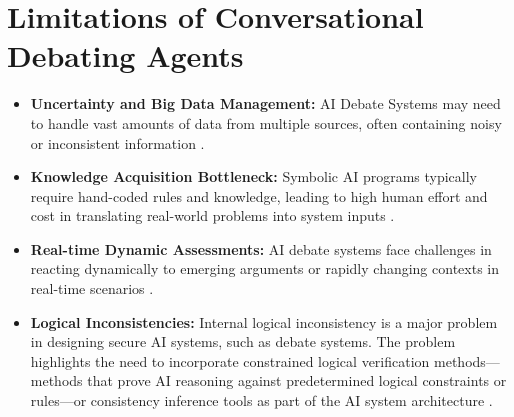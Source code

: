 \documentclass[conference]{IEEEtran}
\begin{document}
\section{Limitations of Conversational Debating Agents}
\begin{itemize}
    \item \textbf{Uncertainty and Big Data Management:} AI Debate Systems may need to handle vast amounts of data from multiple sources, often containing noisy or inconsistent information \cite{b11}.
    
    \item \textbf{Knowledge Acquisition Bottleneck:} Symbolic AI programs typically require hand-coded rules and knowledge, leading to high human effort and cost in translating real-world problems into system inputs \cite{b11}.
    
    \item \textbf{Real-time Dynamic Assessments:} AI debate systems face challenges in reacting dynamically to emerging arguments or rapidly changing contexts in real-time scenarios \cite{b11}.
    
    \item \textbf{Logical Inconsistencies:} Internal logical inconsistency is a major problem in designing secure AI systems, such as debate systems. The problem highlights the need to incorporate constrained logical verification methods—methods that prove AI reasoning against predetermined logical constraints or rules—or consistency inference tools as part of the AI system architecture \cite{b10}.
\end{itemize}
\end{document}
